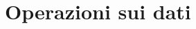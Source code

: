 \documentclass[11pt,fleqn]{book}
\begin{document}












\part{Operazioni sui dati}
\end{document}
